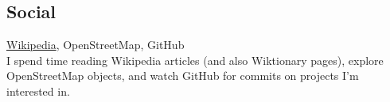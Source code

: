 \documentclass {article}
\begin{document}
    \subsection{Social}
    \href{https://en.wikipedia.org/wiki/User:Rwp0}{Wikipedia}, OpenStreetMap, GitHub\\
    I spend time reading Wikipedia articles (and also Wiktionary pages), explore OpenStreetMap objects, and watch GitHub for commits on projects I'm interested in.

  {} %
\end{document}

